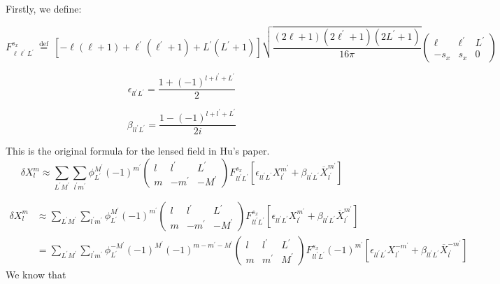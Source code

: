 \documentclass[12pt]{article}
\begin{document}
Firstly, we define:

\begin{equation}
  F_{\ell \ell^{\prime} L^{\prime}}^{s_{x}} \stackrel{\text { def }}{=}\left[-\ell\left(\ell+1\right)+\ell^{\prime}\left(\ell^{\prime}+1\right)+L^{\prime}\left(L^{\prime}+1\right)\right] \sqrt{\frac{\left(2 \ell+1\right)\left(2 \ell^{\prime}+1\right)\left(2 L^{\prime}+1\right)}{16 \pi}}\left(\begin{array}{ccc}{\ell} & {\ell^{\prime}} & {L^{\prime}} \\ {-s_{x}} & {s_{x}} & {0}\end{array}\right)
\end{equation}


\begin{equation}
  \epsilon_{l l^{\prime} L^{\prime}}=\frac{1+(-1)^{l+l^{\prime}+L^{\prime}}}{2}
\end{equation}

\begin{equation}
  \beta_{l l^{\prime} L^{\prime}}=\frac{1-(-1)^{l+l^{\prime}+L^{\prime}}}{2 i}
\end{equation}

This is the original formula for the lensed field in Hu's paper.
\begin{equation}
  \delta X_{l}^{m} \approx \sum_{L^{\prime} M^{\prime}} \sum_{l^{\prime} m^{\prime}} \phi_{L^{\prime}}^{M^{\prime}}(-1)^{m^{\prime}}\left(\begin{array}{ccc}{l} & {l^{\prime}} & {L^{\prime}} \\ {m} & {-m^{\prime}} & {-M^{\prime}}\end{array}\right)  F_{l l^{\prime} L^{\prime}}^{s_{x}}\left[\epsilon_{l l^{\prime} L^{\prime}} X_{l^{\prime}}^{m^{\prime}}+\beta_{l l^{\prime} L^{\prime}} \overline{X}_{l^{\prime}}^{m^{\prime}}\right]
\end{equation}

\begin{align}
  \delta X_{l}^{m} &\approx \sum_{L^{\prime} M^{\prime}} \sum_{l^{\prime} m^{\prime}} \phi_{L^{\prime}}^{M^{\prime}}(-1)^{m^{\prime}}\left(\begin{array}{ccc}{l} & {l^{\prime}} & {L^{\prime}} \\ {m} & {-m^{\prime}} & {-M^{\prime}}\end{array}\right)  F_{l l^{\prime} L^{\prime}}^{s_{x}}\left[\epsilon_{l l^{\prime} L^{\prime}} X_{l^{\prime}}^{m^{\prime}}+\beta_{l l^{\prime} L^{\prime}} \overline{X}_{l^{\prime}}^{m^{\prime}}\right]\\
                   & = \sum_{L^{\prime} M^{\prime}} \sum_{l^{\prime} m^{\prime}}
                     \phi_{L^{\prime}}^{-M^{\prime}}(-1)^{M^{\prime}}(-1)^{m-m^{\prime}-M^{\prime}}\left(\begin{array}{ccc}{l} & {l^{\prime}} & {L^{\prime}} \\ {m} & {m^{\prime}} & {M^{\prime}}\end{array}\right)  F_{l l^{\prime} L^{\prime}}^{s_{x}}(-1)^{m^{\prime}}\left[\epsilon_{l l^{\prime} L^{\prime}} X_{l^{\prime}}^{-m^{\prime}}+\beta_{l l^{\prime} L^{\prime}} \overline{X}_{l^{\prime}}^{-m^{\prime}}\right]
\end{align}
We know that
\end{document}
